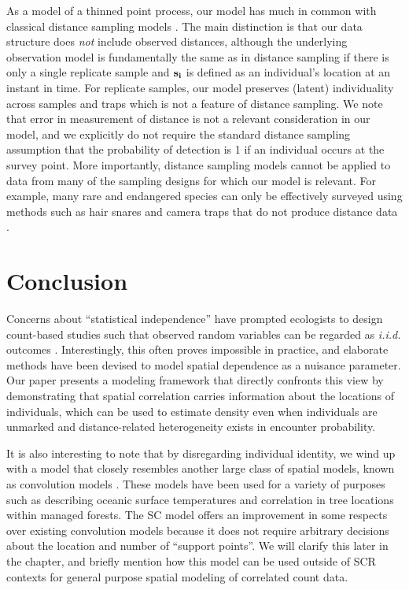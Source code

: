 As a model of a thinned point process, our model has much in common
with classical distance sampling models \citep{buckland_etal:2001}.
The main distinction is that our data structure does {\it not} include
observed distances, although the underlying observation model is
fundamentally the same as in distance sampling if there is only a
single replicate sample and $\bf{s}_i$ is defined as an individual's
location at an instant in time. For replicate samples, our model preserves
(latent) individuality across samples and traps which is not a feature
of distance sampling. We note that error in measurement of distance is
not a relevant consideration in our model, and we explicitly do not
require the standard distance sampling assumption that the probability
of detection is 1 if an individual occurs at the survey point. More
importantly, distance sampling models cannot be applied to data from
many of the sampling designs for which our model is relevant. For
example, many rare and endangered species can only be
effectively surveyed using methods such as hair snares and camera
traps that do not produce distance data \citep{oconnell_etal:2010}.


\section{Conclusion}

Concerns about ``statistical independence'' have prompted
ecologists to design count-based studies such that observed
random variables can be regarded as {\it i.i.d.} outcomes
\citep{hurlbert:1984}. Interestingly, this
often proves impossible in practice, and elaborate
methods have been devised to model spatial dependence as a nuisance
parameter. Our paper presents a modeling framework that directly
confronts this view by demonstrating that spatial
correlation carries information about the locations of individuals,
which can be used to estimate density even when individuals
are unmarked and distance-related heterogeneity exists in encounter
probability.




It is also interesting to note that by disregarding individual
identity, we wind up with a model that closely resembles another large
class of spatial models, known as convolution models
\citep{wolpert_ickstadt:1998,higdon:1998}. These
models have been used for a variety of purposes such as describing oceanic
surface temperatures and correlation in tree locations within managed
forests. The SC model offers an improvement in
some respects over existing convolution models because it does not
require arbitrary decisions about the location and number of ``support
points''. We will clarify this later in the chapter, and briefly
mention how this model can be used outside of SCR contexts for general
purpose spatial modeling of correlated count data.


